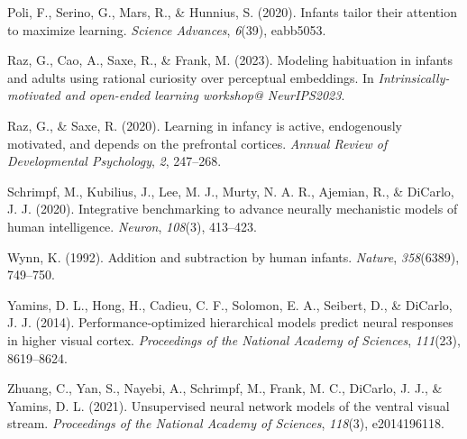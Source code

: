 \documentclass[10pt, letterpaper]{article}
\newenvironment{CSLReferences}%
  {}%
  {\par}
\begin{document}
\begin{CSLReferences}
\leavevmode{}%
Poli, F., Serino, G., Mars, R., \& Hunnius, S. (2020). Infants tailor
their attention to maximize learning. \emph{Science Advances},
\emph{6}(39), eabb5053.

\leavevmode{}%
Raz, G., Cao, A., Saxe, R., \& Frank, M. (2023). Modeling habituation in
infants and adults using rational curiosity over perceptual embeddings.
In \emph{Intrinsically-motivated and open-ended learning workshop@
NeurIPS2023}.

\leavevmode{}%
Raz, G., \& Saxe, R. (2020). Learning in infancy is active, endogenously
motivated, and depends on the prefrontal cortices. \emph{Annual Review
of Developmental Psychology}, \emph{2}, 247--268.

\leavevmode{}%
Schrimpf, M., Kubilius, J., Lee, M. J., Murty, N. A. R., Ajemian, R., \&
DiCarlo, J. J. (2020). Integrative benchmarking to advance neurally
mechanistic models of human intelligence. \emph{Neuron}, \emph{108}(3),
413--423.

\leavevmode{}%
Wynn, K. (1992). Addition and subtraction by human infants.
\emph{Nature}, \emph{358}(6389), 749--750.

\leavevmode{}%
Yamins, D. L., Hong, H., Cadieu, C. F., Solomon, E. A., Seibert, D., \&
DiCarlo, J. J. (2014). Performance-optimized hierarchical models predict
neural responses in higher visual cortex. \emph{Proceedings of the
National Academy of Sciences}, \emph{111}(23), 8619--8624.

\leavevmode{}%
Zhuang, C., Yan, S., Nayebi, A., Schrimpf, M., Frank, M. C., DiCarlo, J.
J., \& Yamins, D. L. (2021). Unsupervised neural network models of the
ventral visual stream. \emph{Proceedings of the National Academy of
Sciences}, \emph{118}(3), e2014196118.

\end{CSLReferences}


\end{document}
